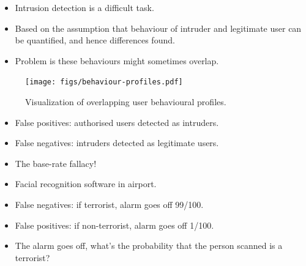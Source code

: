 \begin{frame}
  \begin{remark}
    \begin{itemize}
      \item Intrusion detection is a difficult task.

      \item Based on the assumption that behaviour of intruder and legitimate 
        user can be quantified, and hence differences found.

      \item Problem is these behaviours might sometimes overlap.
    \end{itemize}
  \end{remark}
\end{frame}

\begin{frame}
  \begin{figure}
    \texttt{[image: figs/behaviour-profiles.pdf]}
    \caption{Visualization of overlapping user behavioural profiles.}
  \end{figure}
\end{frame}

\begin{frame}
  \begin{example}
    \begin{itemize}
      \item False positives: authorised users detected as intruders.
      \item False negatives: intruders detected as legitimate users.
    \end{itemize}
  \end{example}

  \pause

  \begin{remark}
    \begin{itemize}
      \item The base-rate fallacy!
    \end{itemize}
  \end{remark}
\end{frame}

\begin{frame}
  \begin{example}
    \begin{itemize}
      \item Facial recognition software in airport.
      \item False negatives: if terrorist, alarm goes off 99/100.
      \item False positives: if non-terrorist, alarm goes off 1/100.
    \end{itemize}
  \end{example}

  \begin{exercise}
    \begin{itemize}
      \item The alarm goes off, what's the probability that the person 
        scanned is a terrorist?
    \end{itemize}
  \end{exercise}
\end{frame}

